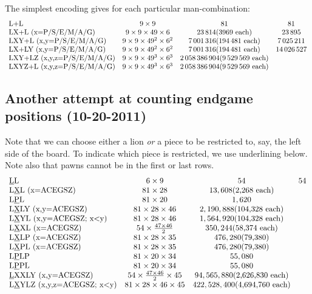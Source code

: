 \documentclass[10pt,dvipdfmx]{report}
\let\x=\times
\begin{document}
The simplest encoding gives for each particular man-combination:
\[\begin{array}{lccc}
\text{L+L} & 9\x9 & 81 & 81 \\
\text{LX+L (x=P/S/E/M/A/G)} & 9\x9\x49\x6 & 23\,814 \text{(3969 each)} & 23\,895 \\
\text{LXY+L (x,y=P/S/E/M/A/G)} & 9\x9\x49^2\x6^2 & 7\,001\,316 \text{(194\,481 each)} & 7\,025\,211 \\
\text{LX+LY (x,y=P/S/E/M/A/G)} & 9\x9\x49^2\x6^2 & 7\,001\,316 \text{(194\,481 each)} & 14\,026\,527 \\
\text{LXY+LZ (x,y,z=P/S/E/M/A/G)} & 9\x9\x49^3\x6^3 & 2\,058\,386\,904 \text{(9\,529\,569 each)} \\
\text{LXYZ+L (x,y,z=P/S/E/M/A/G)} & 9\x9\x49^3\x6^3 & 2\,058\,386\,904 \text{(9\,529\,569 each)} \\
\end{array}\]

\subsection{Another attempt at counting endgame positions (10-20-2011)}

Note that we can choose either a lion {\em or} a piece to be restricted to, say, the left side
of the board.  To indicate which piece is restricted, we use underlining below.  Note also that pawns
cannot be in the first or last rows.
\[\begin{array}{lccc}
\text{\underline{L}L} & 6\x9 & 54 & 54 \\
\text{L\underline{X}L (x=ACEGSZ)} & 81\x28 & 13,608 \text{(2,268 each)} &  \\
\text{L\underline{P}L} & 81\x20 & 1,620 &  \\
\text{L\underline{X}LY (x,y=ACEGSZ)} & 81\x28\x46 & 2,190,888 \text{(104,328 each)} & \\
\text{L\underline{X}YL (x,y=ACEGSZ; x<y)} & 81\x28\x46 & 1,564,920 \text{(104,328 each)} & \\
\text{L\underline{X}XL (x=ACEGSZ)} & 54\x\frac{47\x46}{2} & 350,244 \text{(58,374 each)} & \\
\text{L\underline{X}LP (x=ACEGSZ)} & 81\x28\x35 & 476,280 \text{(79,380)} & \\
\text{L\underline{X}PL (x=ACEGSZ)} & 81\x28\x35 & 476,280 \text{(79,380)} & \\
\text{L\underline{P}LP} & 81\x20\x34 & 55,080 & \\
\text{L\underline{P}PL} & 81\x20\x34 & 55,080 & \\
\text{\underline{L}XXLY (x,y=ACEGSZ)} & 54\x\frac{47\x46}{2}\x45 & 94,565,880 \text{(2,626,830 each)} & \\
\text{L\underline{X}YLZ (x,y,z=ACEGSZ; x<y)} & 81\x28\x46\x45 & 422,528,400 \text{(4,694,760 each)} & \\
\end{array}\]
\end{document}
